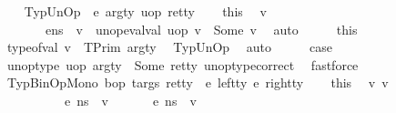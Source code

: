 \begin{isabellebody}
\isamarkupfalse%
\isanewline
\ \ \isamarkupfalse%
\ {\isacharparenleft}{\kern0pt}TypUnOp\ {\isasymDelta}\ e\ arg{\isacharunderscore}{\kern0pt}ty\ uop\ ret{\isacharunderscore}{\kern0pt}ty{\isacharparenright}{\kern0pt}\isanewline
\ \ \isamarkupfalse%
\ this\ \isamarkupfalse%
\ v{\isacharprime}{\kern0pt}\ \ \isanewline
\ \ \ \ \ {\isachardoublequoteopen}{\isasymLambda}{\isacharcomma}{\kern0pt}{\isasymGamma}{\isacharcomma}{\kern0pt}{\isasymOmega}\ {\isasymturnstile}\ {\isasymlangle}e{\isacharcomma}{\kern0pt}n{\isacharunderscore}{\kern0pt}s{\isasymrangle}\ {\isasymDown}\ v{\isacharprime}{\kern0pt}{\isachardoublequoteclose}\ \ {\isachardoublequoteopen}unop{\isacharunderscore}{\kern0pt}eval{\isacharunderscore}{\kern0pt}val\ uop\ v{\isacharprime}{\kern0pt}\ {\isacharequal}{\kern0pt}\ Some\ v{\isachardoublequoteclose}\ \isamarkupfalse%
\ auto\isanewline
\ \ \isamarkupfalse%
\ \isamarkupfalse%
\ this\ \isamarkupfalse%
\ {\isachardoublequoteopen}type{\isacharunderscore}{\kern0pt}of{\isacharunderscore}{\kern0pt}val\ v{\isacharprime}{\kern0pt}\ {\isacharequal}{\kern0pt}\ TPrim\ arg{\isacharunderscore}{\kern0pt}ty{\isachardoublequoteclose}\ \isamarkupfalse%
\ TypUnOp\ \isamarkupfalse%
\ auto\isanewline
\ \ \isamarkupfalse%
\ \isamarkupfalse%
\ {\isacharquery}{\kern0pt}case\ \isamarkupfalse%
\ {\isacartoucheopen}unop{\isacharunderscore}{\kern0pt}type\ uop\ arg{\isacharunderscore}{\kern0pt}ty\ {\isacharequal}{\kern0pt}\ Some\ ret{\isacharunderscore}{\kern0pt}ty{\isacartoucheclose}\ unop{\isacharunderscore}{\kern0pt}type{\isacharunderscore}{\kern0pt}correct\ \isamarkupfalse%
\ fastforce\ \isanewline
{}\isamarkupfalse%
\isanewline
\ \ \isamarkupfalse%
\ {\isacharparenleft}{\kern0pt}TypBinOpMono\ bop\ targs\ ret{\isacharunderscore}{\kern0pt}ty\ {\isasymDelta}\ e{}\ left{\isacharunderscore}{\kern0pt}ty\ e{}\ right{\isacharunderscore}{\kern0pt}ty{\isacharparenright}{\kern0pt}\isanewline
\ \ \isamarkupfalse%
\ this\ \isamarkupfalse%
\ v{}\ v{}\ \ \isanewline
\ \ \ \ \ {\isachardoublequoteopen}\ {\isasymLambda}{\isacharcomma}{\kern0pt}\ {\isasymGamma}{\isacharcomma}{\kern0pt}\ {\isasymOmega}\ {\isasymturnstile}\ {\isasymlangle}e{}{\isacharcomma}{\kern0pt}\ n{\isacharunderscore}{\kern0pt}s{\isasymrangle}\ {\isasymDown}\ v{}{\isachardoublequoteclose}\ \ {\isachardoublequoteopen}\ {\isasymLambda}{\isacharcomma}{\kern0pt}\ {\isasymGamma}{\isacharcomma}{\kern0pt}\ {\isasymOmega}\ {\isasymturnstile}\ {\isasymlangle}e{}{\isacharcomma}{\kern0pt}\ n{\isacharunderscore}{\kern0pt}s{\isasymrangle}\ {\isasymDown}\ v{}{\isachardoublequoteclose}\ \ \isanewline

\end{isabellebody}
